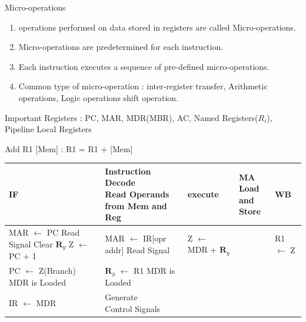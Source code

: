 \begin{enumerate}
    \begin{minipage}{\linewidth}
    \item Micro-operations
    \begin{enumerate}
        \item operations performed on data stored in registers are called Micro-operations.
        \item Micro-operations are predetermined for each instruction.
        \item Each instruction executes a sequence of pre-defined micro-operations.
        \item Common type of micro-operation : inter-register transfer, Arithmetic operations, Logic operations
              shift operation.
    \end{enumerate}
    \end{minipage}

    \item Important Registers : PC, MAR, MDR(MBR), AC, Named Registers(\(R_i\)), Pipeline Local Registers
    \item Add R1 [Mem] : R1 = R1 + [Mem] \\
    \begin{myTableStyle} \begin{tabular}{ |l|l|l|l|l| } \hline
        IF & \makecell[l]{ Instruction Decode \\ Read Operands \\from Mem and Reg}
        &execute & \makecell[l]{ MA \\ Load and \\Store}& WB   \\ \hline

        \makecell[l]{ MAR \(\leftarrow\) PC \\ Read Signal \\ Clear \large{ \( \boldsymbol R_y\)}  \\ Z \(\leftarrow\) PC + 1 }
        & \makecell[l]{ MAR \(\leftarrow\) IR[opr addr] \\ Read Signal } & Z \(\leftarrow\) MDR + \large{ \( \boldsymbol R_y\)}
        & & R1 \(\leftarrow\) Z \\ \hline

        \makecell[l]{ PC \(\leftarrow\) Z(Branch) \\ MDR is Loaded}
        & \makecell[l]{ \large{ \( \boldsymbol R_y\)} \(\leftarrow\) R1 \\ MDR is Loaded} & & & \\ \hline

        IR \(\leftarrow\) MDR & \makecell[l]{ Generate \\ Control Signals } & & & \\ \hline


\end{tabular}
\end{myTableStyle}
\end{enumerate}
